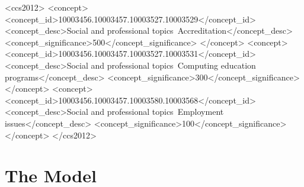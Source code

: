 \documentclass[sigconf]{acmart}
\begin{document}
%
%
 \begin{CCSXML}
	<ccs2012>
	<concept>
	<concept_id>10003456.10003457.10003527.10003529</concept_id>
	<concept_desc>Social and professional topics~Accreditation</concept_desc>
	<concept_significance>500</concept_significance>
	</concept>
	<concept>
	<concept_id>10003456.10003457.10003527.10003531</concept_id>
	<concept_desc>Social and professional topics~Computing education programs</concept_desc>
	<concept_significance>300</concept_significance>
	</concept>
	<concept>
	<concept_id>10003456.10003457.10003580.10003568</concept_id>
	<concept_desc>Social and professional topics~Employment issues</concept_desc>
	<concept_significance>100</concept_significance>
	</concept>
	</ccs2012>
\end{CCSXML}


%

%
\maketitle

\section*{The Model}
\end{document}
